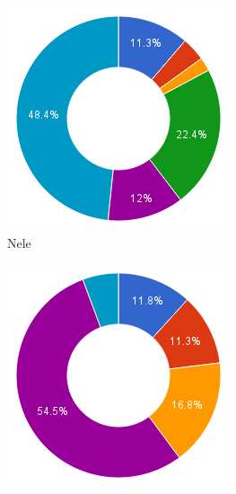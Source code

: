 \documentclass[eind]{penoverslag}
\begin{document}
{%
\begin{figure}
        \centering
        \begin{subfigure}[hb]{0.15\textwidth}
                \centering
                \includegraphics[width=\textwidth]{werk_Nele}
                \caption{Nele}
        \end{subfigure}%
        \begin{subfigure}[hb]{0.15\textwidth}
                \centering
                \includegraphics[width=\textwidth]{werk_Toon}

\end{subfigure}
\end{figure}}
\end{document}
